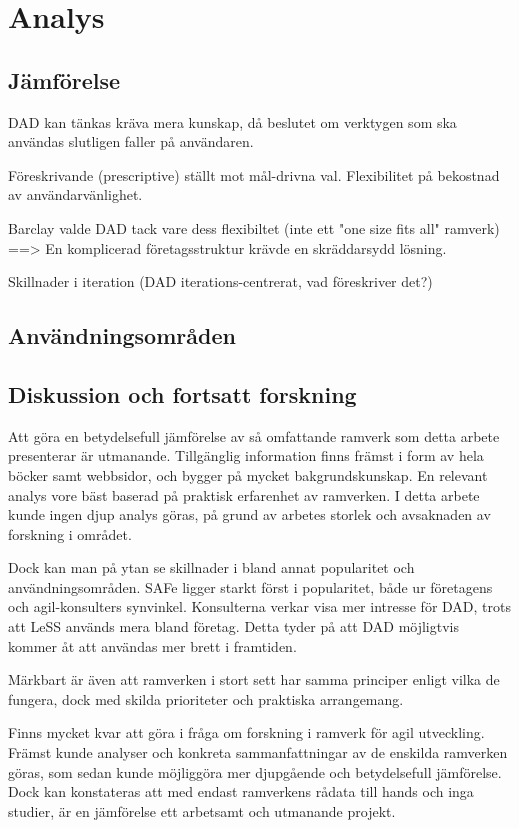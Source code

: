 		
	
\section{Analys}

	\subsection{Jämförelse}
		
		DAD kan tänkas kräva mera kunskap, då beslutet om verktygen som ska användas slutligen faller på användaren.
		
		Föreskrivande (prescriptive) ställt mot mål-drivna val. Flexibilitet på bekostnad av användarvänlighet.
		
		Barclay valde DAD tack vare dess flexibiltet (inte ett "one size fits all" ramverk)
		==> En komplicerad företagsstruktur krävde en skräddarsydd lösning. 
		\cite{barclays_interview}
		
		
		
		Skillnader i iteration (DAD iterations-centrerat, vad föreskriver det?)
	
	\subsection{Användningsområden}
	
	
	
	\subsection{Diskussion och fortsatt forskning}
		Att göra en betydelsefull jämförelse av så omfattande ramverk som detta arbete presenterar är utmanande. Tillgänglig information finns främst i form av hela böcker samt webbsidor, och bygger på mycket bakgrundskunskap. En relevant analys vore bäst baserad på praktisk erfarenhet av ramverken.
		I detta arbete kunde ingen djup analys göras, på grund av arbetes storlek och avsaknaden av forskning i området.
		
		
		Dock kan man på ytan se skillnader i bland annat popularitet och användningsområden. SAFe ligger starkt först i popularitet, både ur företagens och agil-konsulters synvinkel.
		Konsulterna verkar visa mer intresse för DAD, trots att LeSS används mera bland företag. Detta tyder på att DAD möjligtvis kommer åt att användas mer brett i framtiden.
		
		
		Märkbart är även att ramverken i stort sett har samma principer enligt vilka de fungera, dock med skilda prioriteter och praktiska arrangemang.
		
		
		Finns mycket kvar att göra i fråga om forskning i ramverk för agil utveckling. Främst kunde analyser och konkreta sammanfattningar av de enskilda ramverken göras, som sedan kunde möjliggöra mer djupgående och betydelsefull jämförelse. Dock kan konstateras att med endast ramverkens rådata till hands och inga studier, är en jämförelse ett arbetsamt och utmanande projekt.
		
	

	